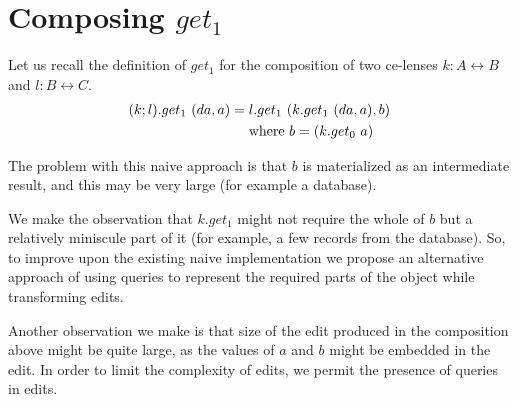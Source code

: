 \documentclass[a4paper,10pt]{article}
\begin{document}
\section{Composing $get_1$}
Let us recall the definition of $get_1$ for the composition of two ce-lenses $k : A \leftrightarrow B $ and $l : B \leftrightarrow C$. 
\begin{align*}
 (k;l).get_1~(da,a) &= l.get_1~(k.get_1~(da,a),b) \\
                    & \quad \textnormal{ where } b = (k.get_0~a)
\end{align*}
% 

The problem with this naive approach is that $b$ is materialized as an intermediate result, and this may be very large (for example a database). 

We make the observation that $k.get_1$
might not require the whole of $b$ but a relatively miniscule
 part of it (for example, a few  records from the
database). So, to improve upon the existing naive implementation we
propose an alternative approach of using queries to represent the
required parts of the object while transforming edits. 

Another observation we make is that size of the edit produced in the composition above might be quite large, as the values of $a$ and $b$ might be embedded in the edit. In order to limit the complexity
of edits, we permit the presence of queries in edits.
\end{document}
